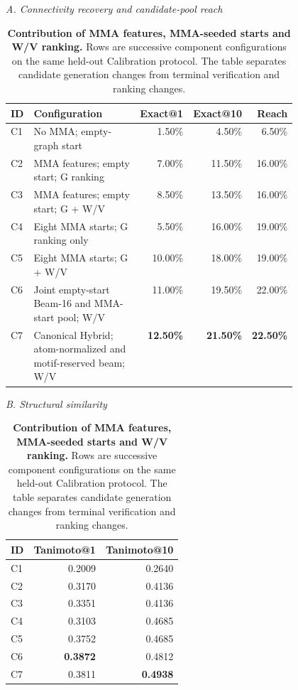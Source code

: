 \begin{table}[!htbp]
\centering
\caption{\textbf{Contribution of MMA features, MMA-seeded starts and W/V ranking.}
Rows are successive component configurations on the same held-out Calibration
protocol. The table separates candidate generation changes from terminal
verification and ranking changes.}
\label{tab:mma_wv_component_ablation}
\small
\setlength{\tabcolsep}{3.5pt}
\renewcommand{\arraystretch}{1.10}
\noindent\textit{A. Connectivity recovery and candidate-pool reach}\par\vspace{3pt}
\begin{tabular}{@{}lp{0.47\linewidth}rrr@{}}
\toprule
ID & Configuration & Exact@1 & Exact@10 & Reach \\
\midrule
C1 & No MMA; empty-graph start & 1.50\% & 4.50\% & 6.50\% \\
C2 & MMA features; empty start; G ranking & 7.00\% & 11.50\% & 16.00\% \\
C3 & MMA features; empty start; G + W/V & 8.50\% & 13.50\% & 16.00\% \\
C4 & Eight MMA starts; G ranking only & 5.50\% & 16.00\% & 19.00\% \\
C5 & Eight MMA starts; G + W/V & 10.00\% & 18.00\% & 19.00\% \\
C6 & Joint empty-start Beam-16 and MMA-start pool; W/V & 11.00\% & 19.50\% & 22.00\% \\
C7 & Canonical Hybrid; atom-normalized and motif-reserved beam; W/V & \textbf{12.50\%} & \textbf{21.50\%} & \textbf{22.50\%} \\
\bottomrule
\end{tabular}
\par\vspace{8pt}
\noindent\textit{B. Structural similarity}\par\vspace{3pt}
\begin{tabular}{@{}lrr@{}}
\toprule
ID & Tanimoto@1 & Tanimoto@10 \\
\midrule
C1 & 0.2009 & 0.2640 \\
C2 & 0.3170 & 0.4136 \\
C3 & 0.3351 & 0.4136 \\
C4 & 0.3103 & 0.4685 \\
C5 & 0.3752 & 0.4685 \\
C6 & \textbf{0.3872} & 0.4812 \\
C7 & 0.3811 & \textbf{0.4938} \\
\bottomrule
\end{tabular}
\end{table}

